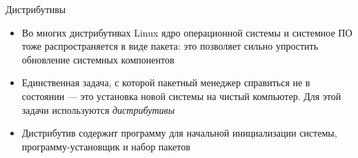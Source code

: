 \documentclass[handout]{beamer}
\begin{document}
\begin{frame}{Дистрибутивы}
	\begin{itemize}
		\item{Во многих дистрибутивах Linux ядро операционной системы и системное ПО тоже распространяется в виде пакета: это позволяет сильно упростить обновление системных компонентов}\pause
		\item{Единственная задача, с которой пакетный менеджер справиться не в состоянии --- это установка новой системы на чистый компьютер. Для этой задачи используются \emph{дистрибутивы}}\pause
		\item{Дистрибутив содержит программу для начальной инициализации системы, программу-установщик и набор пакетов}
	\end{itemize}
\end{frame}
\end{document}
